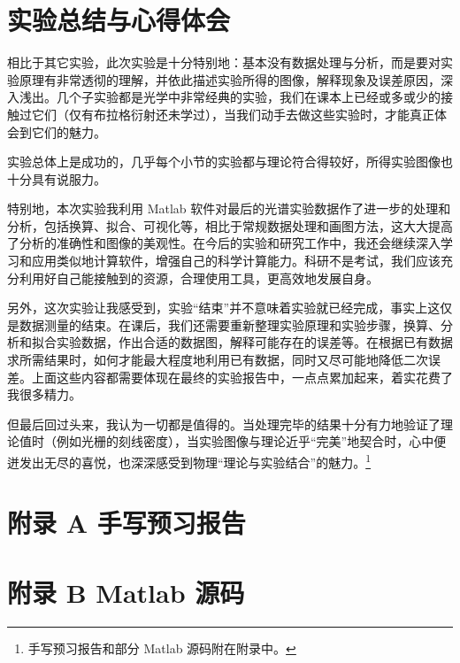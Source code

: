 \documentclass[UTF8]{article}
\theoremstyle{MyLineTheoremStyle} %
\theoremstyle{MyBlockTheoremStyle} %
\theoremstyle{MySubsubsectionStyle} %
\begin{document}
\section{实验总结与心得体会}

相比于其它实验，此次实验是十分特别地：基本没有数据处理与分析，而是要对实验原理有非常透彻的理解，并依此描述实验所得的图像，解释现象及误差原因，深入浅出。几个子实验都是光学中非常经典的实验，我们在课本上已经或多或少的接触过它们（仅有布拉格衍射还未学过），当我们动手去做这些实验时，才能真正体会到它们的魅力。

实验总体上是成功的，几乎每个小节的实验都与理论符合得较好，所得实验图像也十分具有说服力。

特别地，本次实验我利用 Matlab 软件对最后的光谱实验数据作了进一步的处理和分析，包括换算、拟合、可视化等，相比于常规数据处理和画图方法，这大大提高了分析的准确性和图像的美观性。在今后的实验和研究工作中，我还会继续深入学习和应用类似地计算软件，增强自己的科学计算能力。科研不是考试，我们应该充分利用好自己能接触到的资源，合理使用工具，更高效地发展自身。

另外，这次实验让我感受到，实验“结束”并不意味着实验就已经完成，事实上这仅是数据测量的结束。在课后，我们还需要重新整理实验原理和实验步骤，换算、分析和拟合实验数据，作出合适的数据图，解释可能存在的误差等。在根据已有数据求所需结果时，如何才能最大程度地利用已有数据，同时又尽可能地降低二次误差。上面这些内容都需要体现在最终的实验报告中，一点点累加起来，着实花费了我很多精力。

但最后回过头来，我认为一切都是值得的。当处理完毕的结果十分有力地验证了理论值时（例如光栅的刻线密度），当实验图像与理论近乎“完美”地契合时，心中便迸发出无尽的喜悦，也深深感受到物理“理论与实验结合”的魅力。\footnote{手写预习报告和部分 Matlab 源码附在附录中。}


\newpage
\section*{附录 A\hspace*{20pt} 手写预习报告}
\thispagestyle{fancy} 

\begin{figure}[H]\centering
    
\end{figure}


\section*{附录 B\hspace*{20pt} Matlab 源码}
\thispagestyle{fancy} 

\end{document}
